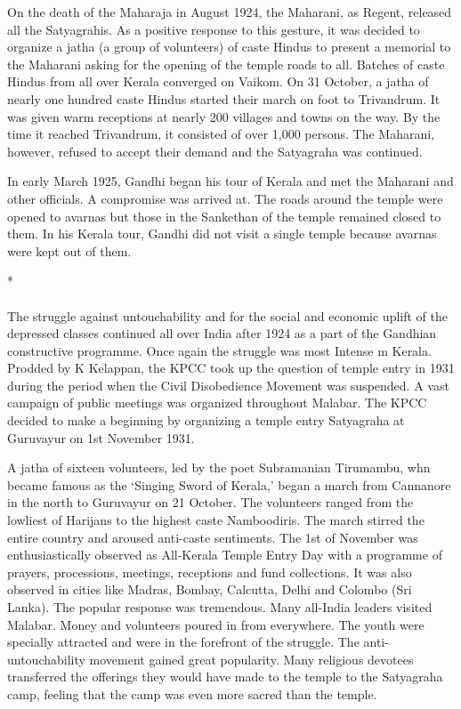 On the death of the Maharaja in August 1924, the Maharani, as Regent, released all the Satyagrahis. As a positive response to this gesture, it was decided to organize a jatha (a group of volunteers) of caste Hindus to present a memorial to the Maharani asking for the opening of the temple roads to all. Batches of caste Hindus from all over Kerala converged on Vaikom. On 31 October, a jatha of nearly one hundred caste Hindus started their march on foot to Trivandrum. It was given warm receptions at nearly 200 villages and towns on the way. By the time it reached Trivandrum, it consisted of over 1,000 persons. The Maharani, however, refused to accept their demand and the Satyagraha was continued.

In early March 1925, Gandhi began his tour of Kerala and met the Maharani and other officials. A compromise was arrived at. The roads around the temple were opened to avarnas but those in the Sankethan of the temple remained closed to them. In his Kerala tour, Gandhi did not visit a single temple because avarnas were kept out of them.

\begin{center}*\end{center}

\paragraph*{}

The struggle against untouchability and for the social and economic uplift of the depressed classes continued all over India after 1924 as a part of the Gandhian constructive programme. Once again the struggle was most Intense m Kerala. Prodded by K Kelappan, the KPCC took up the question of temple entry in 1931 during the period when the Civil Disobedience Movement was suspended. A vast campaign of public meetings was organized throughout Malabar. The KPCC decided to make a beginning by organizing a temple entry Satyagraha at Guruvayur on 1st November 1931.

A jatha of sixteen volunteers, led by the poet Subramanian Tirumambu, whn became famous as the `Singing Sword of Kerala,' began a march from Cannanore in the north to Guruvayur on 21 October. The volunteers ranged from the lowliest of Harijans to the highest caste Namboodiris. The march stirred the entire country and aroused anti-caste sentiments. The 1st of November was enthusiastically observed as All-Kerala Temple Entry Day with a programme of prayers, processions, meetings, receptions and fund collections. It was also observed in cities like Madras, Bombay, Calcutta, Delhi and Colombo (Sri Lanka). The popular response was tremendous. Many all-India leaders visited Malabar. Money and volunteers poured in from everywhere. The youth were specially attracted and were in the forefront of the struggle. The anti-untouchability movement gained great popularity. Many religious devotees transferred the offerings they would have made to the temple to the Satyagraha camp, feeling that the camp was even more sacred than the temple.


